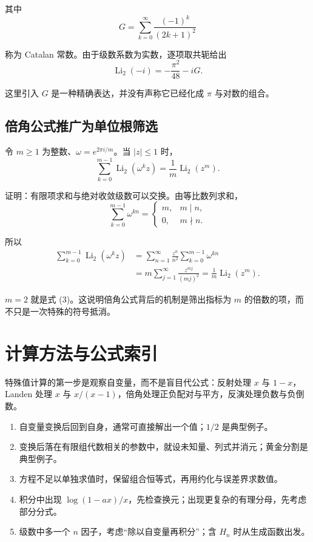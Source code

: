 \documentclass[11pt,a4paper]{article}
\providecommand{\tightlist}{\setlength{\itemsep}{3pt}\setlength{\parskip}{0pt}}
\begin{document}
其中
\[
G=\sum_{k=0}^{\infty}\frac{(-1)^k}{(2k+1)^2}
\]

称为 Catalan 常数。由于级数系数为实数，逐项取共轭给出
\[
\operatorname{Li}_2(-i)=-\frac{\pi^2}{48}-iG.
\]

这里引入 \(G\) 是一种精确表达，并没有声称它已经化成 \(\pi\)
与对数的组合。

\hypertarget{ux500dux89d2ux516cux5f0fux63a8ux5e7fux4e3aux5355ux4f4dux6839ux7b5bux9009}{%
\subsection{倍角公式推广为单位根筛选}\label{ux500dux89d2ux516cux5f0fux63a8ux5e7fux4e3aux5355ux4f4dux6839ux7b5bux9009}}

令 \(m\geqslant1\) 为整数、\(\omega=e^{2\pi i/m}\)。当 \(|z|\leqslant1\)
时，
\[
\sum_{k=0}^{m-1}\operatorname{Li}_2(\omega^kz)
=\frac1m\operatorname{Li}_2(z^m).
\]

证明：有限项求和与绝对收敛级数可以交换。由等比数列求和，
\[
\sum_{k=0}^{m-1}\omega^{kn}
=\begin{cases}m,&m\mid n,\\0,&m\nmid n.\end{cases}
\]

所以
\[
\begin{aligned}
\sum_{k=0}^{m-1}\operatorname{Li}_2(\omega^kz)
&=\sum_{n=1}^{\infty}\frac{z^n}{n^2}\sum_{k=0}^{m-1}\omega^{kn}\\
&=m\sum_{j=1}^{\infty}\frac{z^{mj}}{(mj)^2}
=\frac1m\operatorname{Li}_2(z^m).
\end{aligned}
\]

\(m=2\) 就是式 (3)。这说明倍角公式背后的机制是筛出指标为 \(m\)
的倍数的项，而不只是一次特殊的符号抵消。

\hypertarget{ux8ba1ux7b97ux65b9ux6cd5ux4e0eux516cux5f0fux7d22ux5f15}{%
\section{计算方法与公式索引}\label{ux8ba1ux7b97ux65b9ux6cd5ux4e0eux516cux5f0fux7d22ux5f15}}

特殊值计算的第一步是观察自变量，而不是盲目代公式：反射处理 \(x\) 与
\(1-x\)，Landen 处理 \(x\) 与
\(x/(x-1)\)，倍角处理正负配对与平方，反演处理负数与负倒数。

\begin{enumerate}
\def\labelenumi{\arabic{enumi}.}
\tightlist
\item
  自变量变换后回到自身，通常可直接解出一个值；\(1/2\) 是典型例子。
\item
  变换后落在有限组代数相关的参数中，就设未知量、列式并消元；黄金分割是典型例子。
\item
  方程不足以单独求值时，保留组合恒等式，再用约化与误差界求数值。
\item
  积分中出现
  \(\log(1-ax)/x\)，先检查换元；出现更复杂的有理分母，先考虑部分分式。
\item
  级数中多一个 \(n\) 因子，考虑``除以自变量再积分''；含 \(H_n\)
  时从生成函数出发。
\end{enumerate}
\end{document}
